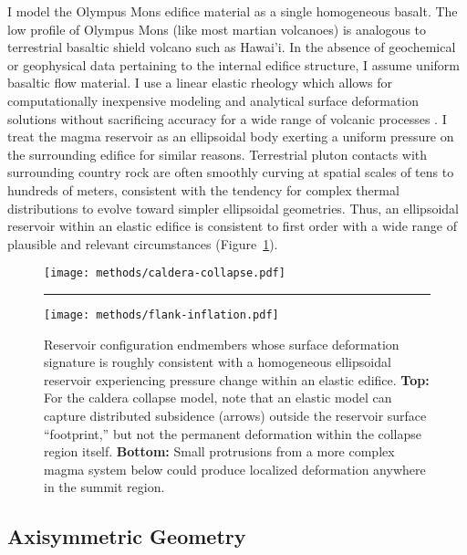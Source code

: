 I model the Olympus Mons edifice material as a single homogeneous basalt. The low profile of Olympus Mons (like most martian volcanoes) is analogous to terrestrial basaltic shield volcano such as Hawai'i. In the absence of geochemical or geophysical data pertaining to the internal edifice structure, I assume uniform basaltic flow material. I use a linear elastic rheology which allows for computationally inexpensive modeling and analytical surface deformation solutions \parencite{mogi_relations_1958} without sacrificing accuracy for a wide range of volcanic processes \parencite{grosfils_elastic_2015}. I treat the magma reservoir as an ellipsoidal body exerting a uniform pressure on the surrounding edifice for similar reasons. Terrestrial pluton contacts with surrounding country rock are often smoothly curving at spatial scales of tens to hundreds of meters, consistent with the tendency for complex thermal distributions to evolve toward simpler ellipsoidal geometries. Thus, an ellipsoidal reservoir within an elastic edifice is consistent to first order with a wide range of plausible and relevant circumstances (Figure~\ref{fig:reservoir-configs}).

\begin{figure}
    \texttt{[image: methods/caldera-collapse.pdf]}\\
    \vspace{1cm}
    \hrule
    \vspace{1cm}
    \texttt{[image: methods/flank-inflation.pdf]}
    \caption[Ellipsoidal reservoir configurations]{Reservoir configuration endmembers whose surface deformation signature is roughly consistent with a homogeneous ellipsoidal reservoir experiencing pressure change within an elastic edifice. \textbf{Top:} For the caldera collapse model, note that an elastic model can capture distributed subsidence (arrows) outside the reservoir surface ``footprint,'' but not the permanent deformation within the collapse region itself. \textbf{Bottom:} Small protrusions from a more complex magma system below could produce localized deformation anywhere in the summit region.}
    \label{fig:reservoir-configs}
\end{figure}

\subsection{Axisymmetric Geometry}

